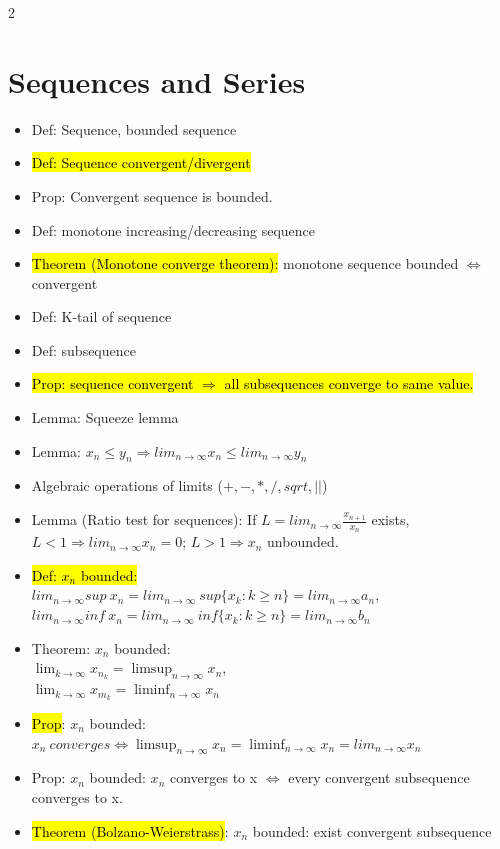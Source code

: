 \documentclass[a4paper,10pt]{article}
\begin{document}
\begin{multicols}{2}
\begin{itemize}
\end{itemize}

\section*{Sequences and Series}
\begin{itemize}
    \item Def: Sequence, bounded sequence
    \item \hl{Def: Sequence convergent/divergent}
    \item Prop: Convergent sequence is bounded.
    \item Def: monotone increasing/decreasing sequence
    \item \hl{Theorem (Monotone converge theorem):} monotone sequence bounded $\Leftrightarrow$ convergent
    \item Def: K-tail of sequence
    \item Def: subsequence
    \item \hl{Prop: sequence convergent $\Rightarrow$ all subsequences converge to same value.}
    \item Lemma: Squeeze lemma
    \item Lemma: $x_n\le y_n\Rightarrow lim_{n\to \infty}x_n\le lim_{n\to \infty}y_n$
    \item Algebraic operations of limits ($+,-,*,/,sqrt,||$)
    \item Lemma (Ratio test for sequences): If $L=lim_{n\to \infty} \frac{x_{n+1}}{x_{n}}$ exists, $L<1\Rightarrow lim_{n\to \infty}x_n=0$; $L>1\Rightarrow x_n$ unbounded.
    \item \hl{Def: $x_n$ bounded:}\\ $lim_{n\to \infty}sup\ x_n=lim_{n\to \infty}\ sup\{x_k:k\ge n\}=lim_{n\to \infty}a_n$,\\ $lim_{n\to \infty}inf\ x_n=lim_{n\to \infty}\ inf\{x_k:k\ge n\}=lim_{n\to \infty}b_n$
    \item Theorem: ${x_n}$ bounded:\\ $\lim_{k \to \infty} x_{n_k} = \limsup_{n \to \infty} x_n$,\\ $\lim_{k \to \infty} x_{m_k} = \liminf_{n \to \infty} x_n$
    \item \hl{Prop}: $x_n$ bounded: $x_n\ converges \Leftrightarrow \limsup_{n \to \infty} x_n=\liminf_{n \to \infty} x_n=lim_{n\to \infty}x_n$
    \item Prop: $x_n$ bounded: $x_n$ converges to x $\Leftrightarrow$ every convergent subsequence converges to x.
    \item \hl{Theorem (Bolzano-Weierstrass)}: $x_n$ bounded: exist convergent subsequence 

\end{itemize}
\end{multicols}
\end{document}
